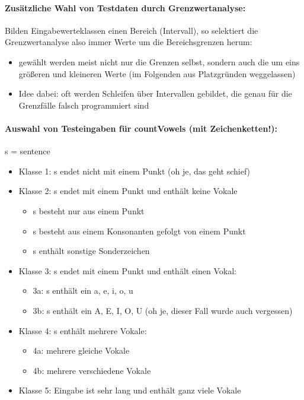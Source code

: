 \paragraph{Zusätzliche Wahl von Testdaten durch Grenzwertanalyse:}

Bilden Eingabewerteklassen einen Bereich (Intervall), so selektiert die Grenzwertanalyse also immer Werte um die Bereichsgrenzen herum:
\begin{itemize}
	\item gewählt werden meist nicht nur die Grenzen selbst, sondern auch die um eins größeren und kleineren Werte (im Folgenden aus Platzgründen weggelassen)
	\item Idee dabei: oft werden Schleifen über Intervallen gebildet, die genau für die Grenzfälle falsch programmiert sind
\end{itemize}

\paragraph{Auswahl von Testeingaben für countVowels (mit Zeichenketten!):}
s = sentence
\begin{itemize}
	\item Klasse 1: s endet nicht mit einem Punkt (oh je, das geht schief)
	\item Klasse 2: s endet mit einem Punkt und enthält keine Vokale
	\begin{itemize}
		\item s besteht nur aus einem Punkt
		\item s besteht aus einem Konsonanten gefolgt von einem Punkt
		\item s enthält sonstige Sonderzeichen
	\end{itemize}
	\item Klasse 3: s endet mit einem Punkt und enthält einen Vokal:
	\begin{itemize}
		\item 3a: s enthält ein a, e, i, o, u
		\item 3b: s enthält ein A, E, I, O, U (oh je, dieser Fall wurde auch vergessen)
	\end{itemize}
	\item Klasse 4: s enthält mehrere Vokale:
	\begin{itemize}
		\item 4a: mehrere gleiche Vokale
		\item 4b: mehrere verschiedene Vokale
	\end{itemize}
	\item Klasse 5: Eingabe ist sehr lang und enthält ganz viele Vokale
\end{itemize}

